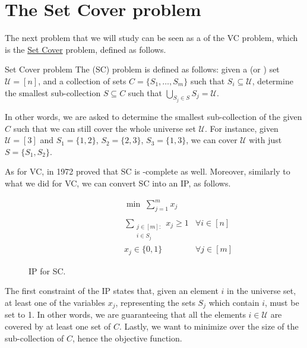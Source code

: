 \documentclass[a4paper, 12pt]{report}
\begin{document}
    \section{The Set Cover problem}

    The next problem that we will study can be seen as a  of the VC problem, which is the \href{https://en.wikipedia.org/wiki/Set_cover_problem}{Set Cover} problem, defined as follows.

    \begin{frameddefn}{Set Cover problem}
        The  (SC) problem is defined as follows: given a  (or ) set $\mathcal U = [n]$, and a collection of sets $C = \{S_1, \ldots, S_m\}$ such that $S_i \subseteq \mathcal U$, determine the smallest sub-collection $S \subseteq C$ such that $\bigcup_{S_j \in S}{S_j} = \mathcal U$.
    \end{frameddefn}

    In other words, we are asked to determine the smallest sub-collection of the given $C$ such that we can still cover the whole universe set $\mathcal U$. For instance, given $\mathcal U = [3]$ and $S_1 = \{1, 2\}$, $S_2 = \{2, 3\}$, $S_3 = \{1, 3\}$, we can cover $\mathcal U$ with just $S = \{S_1, S_2\}$.

    As for VC, in 1972 \cite{karp} proved that SC is \NPclass-complete as well. Moreover, similarly to what we did for VC, we can convert SC into an IP, as follows.

    \begin{figure}[H]
        \centering
        \[\begin{array}{ccl}
            \qquad\qquad\quad
            & \min \; \displaystyle \sum_{j = 1}^m {x_j} \\\\
            & \sum\limits_{\substack{j \in [m] : \\ i \in S_j}}{x_j} \ge 1 & \forall i \in [n] \\
            & x_j \in \{0, 1\} & \forall j \in [m]
        \end{array}\]
        \caption{IP for SC.}
    \end{figure}

    The first constraint of the IP states that, given an element $i$ in the universe set, at least one of the variables $x_j$, representing the sets $S_j$ which contain $i$, must be set to 1. In other words, we are guaranteeing that all the elements $i \in \mathcal U$ are covered by at least one set of $C$. Lastly, we want to minimize over the size of the sub-collection of $C$, hence the objective function.
\end{document}
